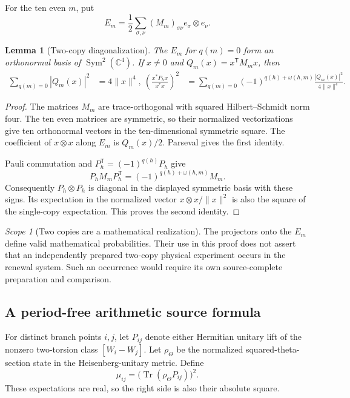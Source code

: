 \documentclass[11pt]{article}
\newtheorem{lemma}[lemma]{Lemma}
\theoremstyle{definition}
\theoremstyle{remark}
\newtheorem{scope}[scope]{Scope}
\newcommand{\C}{\mathbb C}
\newcommand{\Tr}{\operatorname{Tr}}
\newcommand{\norm}[1]{\lVert#1\rVert}
\begin{document}
For the ten even $m$, put
\[
 E_m=\frac12\sum_{\sigma,\nu}(M_m)_{\sigma\nu}
                     e_\sigma\otimes e_\nu.
\]

\begin{lemma}[Two-copy diagonalization]
\label{lem:v3-bell}
The $E_m$ for $q(m)=0$ form an orthonormal basis of
$\operatorname{Sym}^2(\C^4)$. If $x\ne0$ and
$Q_m(x)=x^{\mathsf T}M_mx$, then
\begin{align}
 \sum_{q(m)=0}|Q_m(x)|^2&=4\norm{x}^4,\
 \left(\frac{x^*P_hx}{x^*x}\right)^2
 &=\sum_{q(m)=0}(-1)^{q(h)+\omega(h,m)}
               \frac{|Q_m(x)|^2}{4\norm{x}^4}.
 \label{eq:v3-bell-identities}
\end{align}
\end{lemma}
\begin{proof}
The matrices $M_m$ are trace-orthogonal with squared Hilbert--Schmidt norm
four. The ten even matrices are symmetric, so their normalized
vectorizations give ten orthonormal vectors in the ten-dimensional
symmetric square. The coefficient of $x\otimes x$ along $E_m$ is
$Q_m(x)/2$. Parseval gives the first identity.

Pauli commutation and $P_h^{\mathsf T}=(-1)^{q(h)}P_h$ give
\[
 P_hM_mP_h^{\mathsf T}
   =(-1)^{q(h)+\omega(h,m)}M_m.
\]
Consequently $P_h\otimes P_h$ is diagonal in the displayed symmetric
basis with these signs. Its expectation in the normalized vector
$x\otimes x/\norm{x}^2$ is also the square of the single-copy
expectation. This proves the second identity.
\end{proof}

\begin{scope}[Two copies are a mathematical realization]
The projectors onto the $E_m$ define valid mathematical probabilities. Their
use in this proof does not assert that an independently prepared two-copy
physical experiment occurs in the renewal system. Such an occurrence would
require its own source-complete preparation and comparison.
\end{scope}

\subsection{A period-free arithmetic source formula}
For distinct branch points $i,j$, let $P_{ij}$ denote either Hermitian
unitary lift of the nonzero two-torsion class $[W_i-W_j]$. Let
$\rho_\Theta$ be the normalized squared-theta-section state in the
Heisenberg-unitary metric. Define
\begin{equation}
 \mu_{ij}=\big(\Tr(\rho_\Theta P_{ij})\big)^2.
 \label{eq:v3-mu-definition}
\end{equation}
These expectations are real, so the right side is also their absolute
square.
\end{document}
